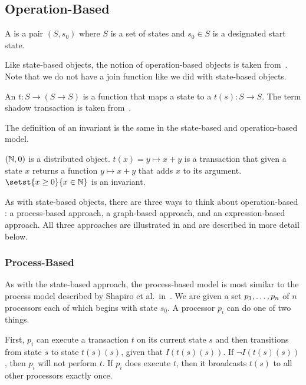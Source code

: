 \subsection{Operation-Based}
\begin{definition}
  A  is a pair $(S, s_0)$ where $S$
  is a set of states and $s_0 \in S$ is a designated start state.
\end{definition}

Like state-based objects, the notion of operation-based objects is taken
from~\cite{shapiro2011conflict}. Note that we do not have a join function like
we did with state-based objects.

\begin{definition}
  An  $t: S \to (S \to S)$ is a function
  that maps a state to a  $t(s): S \to S$. The term
  shadow transaction is taken from~\cite{li2014automating}.
\end{definition}

The definition of an invariant is the same in the state-based and
operation-based model.

\begin{example}
  $(\mathbb{N}, 0)$ is a distributed object. $t(x) = y \mapsto x + y$ is a
  transaction that given a state $x$ returns a function $y \mapsto x + y$ that
  adds $x$ to its argument. $\setst{x \geq 0}{x \in \nats}$ is an invariant.
\end{example}

As with state-based objects, there are three ways to think about
operation-based \Iconfluence{}: a process-based approach, a graph-based
approach, and an expression-based approach. All three approaches are
illustrated in  and are described in more detail below.



\subsubsection{Process-Based}
As with the state-based approach, the process-based model is most similar to
the process model described by Shapiro et al.\ in~\cite{shapiro2011conflict}.
We are given a set ${p}_{1}, \ldots, {p}_{n}$ of $n$ processors each of which begins with
state $s_0$. A processor $p_i$ can do one of two things.

First, $p_i$ can execute a transaction $t$ on its current state $s$ and then
transitions from state $s$ to state $t(s)(s)$, given that $I(t(s)(s))$. If
$\lnot I(t(s)(s))$, then $p_i$ will not perform $t$. If $p_i$ does execute $t$,
then it broadcasts $t(s)$ to all other processors exactly once.

